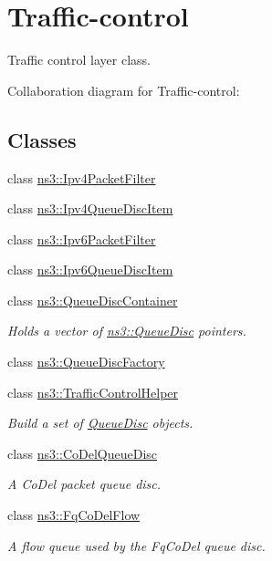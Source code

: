 \hypertarget{group__traffic-control}{}\section{Traffic-\/control}
\label{group__traffic-control}


Traffic control layer class.  


Collaboration diagram for Traffic-\/control\+:
\subsection*{Classes}
\begin{DoxyCompactItemize}
\item 
class \hyperlink{classns3_1_1Ipv4PacketFilter}{ns3\+::\+Ipv4\+Packet\+Filter}
\item 
class \hyperlink{classns3_1_1Ipv4QueueDiscItem}{ns3\+::\+Ipv4\+Queue\+Disc\+Item}
\item 
class \hyperlink{classns3_1_1Ipv6PacketFilter}{ns3\+::\+Ipv6\+Packet\+Filter}
\item 
class \hyperlink{classns3_1_1Ipv6QueueDiscItem}{ns3\+::\+Ipv6\+Queue\+Disc\+Item}
\item 
class \hyperlink{classns3_1_1QueueDiscContainer}{ns3\+::\+Queue\+Disc\+Container}
\begin{DoxyCompactList}\small\item\em Holds a vector of \hyperlink{classns3_1_1QueueDisc}{ns3\+::\+Queue\+Disc} pointers. \end{DoxyCompactList}\item 
class \hyperlink{classns3_1_1QueueDiscFactory}{ns3\+::\+Queue\+Disc\+Factory}
\item 
class \hyperlink{classns3_1_1TrafficControlHelper}{ns3\+::\+Traffic\+Control\+Helper}
\begin{DoxyCompactList}\small\item\em Build a set of \hyperlink{classns3_1_1QueueDisc}{Queue\+Disc} objects. \end{DoxyCompactList}\item 
class \hyperlink{classns3_1_1CoDelQueueDisc}{ns3\+::\+Co\+Del\+Queue\+Disc}
\begin{DoxyCompactList}\small\item\em A Co\+Del packet queue disc. \end{DoxyCompactList}\item 
class \hyperlink{classns3_1_1FqCoDelFlow}{ns3\+::\+Fq\+Co\+Del\+Flow}
\begin{DoxyCompactList}\small\item\em A flow queue used by the Fq\+Co\+Del queue disc. \end{DoxyCompactList}\item 

\end{DoxyCompactItemize}

